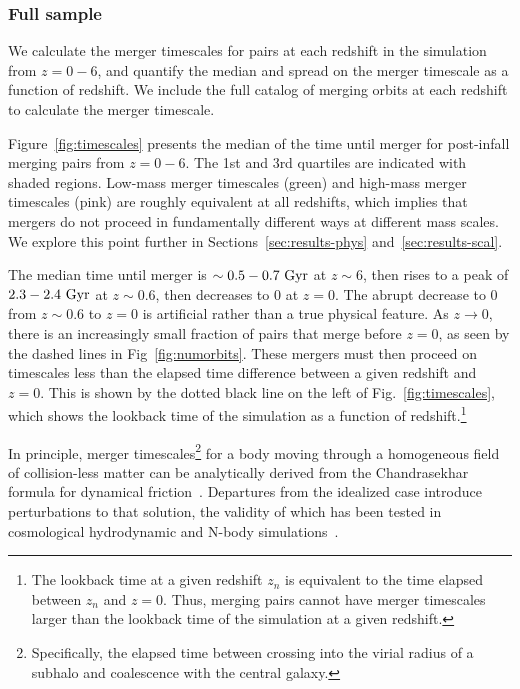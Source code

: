 \documentclass[twocolumn,linenumbers]{aastex631}
\begin{document}
    \subsubsection{Full sample}
        We calculate the merger timescales for pairs at each redshift in the simulation from $z=0-6$, and quantify the median and spread on the merger timescale as a function of redshift. 
        We include the full catalog of merging orbits at each redshift to calculate the merger timescale. 
        
        Figure~\ref{fig:timescales} presents the median of the time until merger for post-infall merging pairs from $z=0-6$. 
        The 1st and 3rd quartiles are indicated with shaded regions. 
        Low-mass merger timescales (green) and high-mass merger timescales (pink) are roughly equivalent at all redshifts, which implies that mergers do not proceed in fundamentally different ways at different mass scales. 
        We explore this point further in Sections~\ref{sec:results-phys} and~\ref{sec:results-scal}.
        
        The median time until merger is $\sim0.5-0.7\,\mathrm{\,Gyr}$ at $z\sim6$, then rises to a peak of $2.3-2.4\,\mathrm{\,Gyr}$ at $z\sim0.6$, then decreases to 0 at $z=0$.
        The abrupt decrease to 0 from $z\sim0.6$ to $z=0$ is artificial rather than a true physical feature. 
        As $z\to0$, there is an increasingly small fraction of pairs that merge before $z=0$, as seen by the dashed lines in Fig~\ref{fig:numorbits}. 
        These mergers must then proceed on timescales less than the elapsed time difference between a given redshift and $z=0$. 
        This is shown by the dotted black line on the left of Fig.~\ref{fig:timescales}, which shows the lookback time of the simulation as a function of redshift.\footnote{The lookback time at a given redshift $z_n$ is equivalent to the time elapsed between $z_n$ and $z=0$. Thus, merging pairs cannot have merger timescales larger than the lookback time of the simulation at a given redshift.} %

        In principle, merger timescales\footnote{Specifically, the elapsed time between crossing into the virial radius of a subhalo and coalescence with the central galaxy.} for a body moving through a homogeneous field of collision-less matter can be analytically derived from the Chandrasekhar formula for dynamical friction~\citep{Binney2008}. 
        Departures from the idealized case introduce perturbations to that solution, the validity of which has been tested in cosmological hydrodynamic and N-body simulations~\citep{Jiang2008, Boylan_kolchin2008}. 
\end{document}
